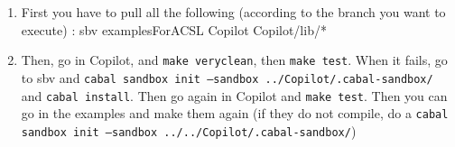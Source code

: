 \begin{enumerate}
\item First you have to pull all the following (according to the branch you want to execute) :
\subitem sbv
\subitem examplesForACSL
\subitem Copilot
\subitem Copilot/lib/*
\item Then, go in Copilot, and \texttt{make veryclean}, then \texttt{make test}. When it fails, go to sbv and \texttt{cabal sandbox init --sandbox ../Copilot/.cabal-sandbox/} and \texttt{cabal install}. Then go again in Copilot and \texttt{make test}. Then you can go in the examples and make them again (if they do not compile, do a \texttt{cabal sandbox init --sandbox ../../Copilot/.cabal-sandbox/})
\end{enumerate}



